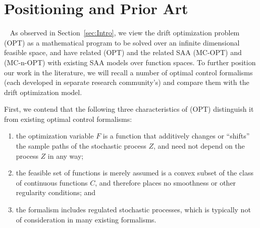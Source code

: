 \documentclass[11pt,leqno]{amsart}
\begin{document}
\section{Positioning and Prior Art}~\label{sec:prior}
As observed in Section~\ref{sec:Intro}, we view the drift optimization problem (OPT) as a mathematical program to be solved over an infinite dimensional feasible space, and have related (OPT) and the related SAA (MC-OPT) and (MC-n-OPT) with existing SAA models over function spaces. To further position our work in the literature, we will recall a number of optimal control formalisms (each developed in separate research community's) and compare them with the drift optimization model. 

First, we contend that the following three characteristics of (OPT) distinguish it from existing optimal control formalisms:
\begin{enumerate}
    \item[(i)] the optimization variable $F$ is a function that additively changes or ``shifts'' the sample paths of the stochastic process $Z$, and need not depend on the process $Z$ in any way;
    \item[(ii)] the feasible set of functions is merely assumed is a convex subset of the class of continuous functions $C$, and therefore places no smoothness or other regularity conditions; and
    \item[(iii)] the formalism includes regulated stochastic processes, which is typically not of consideration in many existing formalisms.
\end{enumerate}
 


\end{document}

